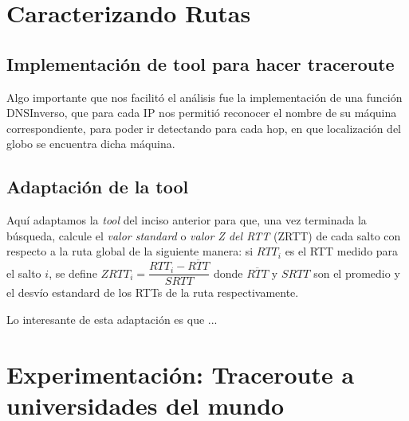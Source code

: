\documentclass[final,inline,a4paper,narroweqnarray]{ieee}
\let\Oldsection\section
\renewcommand{\section}{\FloatBarrier\Oldsection}
\let\Oldsubsection\subsection
\renewcommand{\subsection}{\FloatBarrier\Oldsubsection}
\begin{document}
\section{Caracterizando Rutas}

  \subsection{Implementación de tool para hacer traceroute}
  Algo importante que nos facilitó el análisis fue la implementación de una función
  DNSInverso, que para cada IP nos permitió reconocer el nombre de su máquina correspondiente,
  para poder ir detectando para cada hop, en que localización del globo se encuentra dicha
  máquina. 

  \subsection{Adaptación de la tool}
  Aquí adaptamos la \emph{tool} del inciso anterior para que, una vez terminada 
  la búsqueda, calcule el \emph{valor standard}  o \emph{valor Z del RTT} (ZRTT) 
  de cada salto con respecto a la ruta global de la siguiente manera: si $RTT_i$ 
  es el RTT medido para el salto $i$, se define $ ZRTT_i = \dfrac{RTT_i 
  - \overline{RTT}}{SRTT} $ donde $\overline{RTT}$ y $SRTT$ son el promedio 
  y el desvío estandard de los RTTs de la ruta respectivamente.  

  Lo interesante de esta adaptación es que ...

\section{Experimentación: Traceroute a universidades del mundo}
\end{document}
